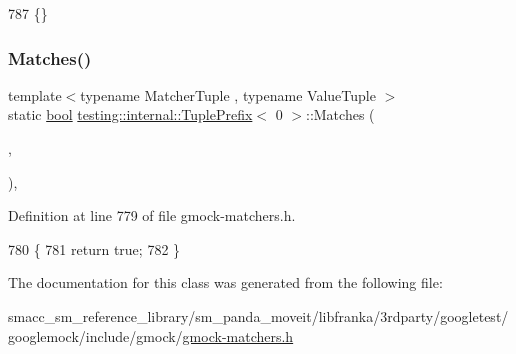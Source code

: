 \begin{DoxyCode}
787                                                     \{\}
\end{DoxyCode}
\mbox{\label{classtesting_1_1internal_1_1TuplePrefix_3_010_01_4_a8bb323da9f209f4fef5d81d7c0b628e9}} 
\subsubsection{\texorpdfstring{Matches()}{Matches()}}
{\footnotesize\ttfamily template$<$typename Matcher\+Tuple , typename Value\+Tuple $>$ \\
static \hyperlink{classbool}{bool} \hyperlink{classtesting_1_1internal_1_1TuplePrefix}{testing\+::internal\+::\+Tuple\+Prefix}$<$ 0 $>$\+::Matches (\begin{DoxyParamCaption}\item[{const \hyperlink{structtesting_1_1internal_1_1MatcherTuple}{Matcher\+Tuple} \&}]{,  }\item[{const Value\+Tuple \&}]{ }\end{DoxyParamCaption})\hspace{0.3cm}{\ttfamily [inline]}, {\ttfamily [static]}}



Definition at line 779 of file gmock-\/matchers.\+h.


\begin{DoxyCode}
780                                            \{
781     \textcolor{keywordflow}{return} \textcolor{keyword}{true};
782   \}
\end{DoxyCode}


The documentation for this class was generated from the following file\+:\begin{DoxyCompactItemize}
\item 
smacc\+\_\+sm\+\_\+reference\+\_\+library/sm\+\_\+panda\+\_\+moveit/libfranka/3rdparty/googletest/googlemock/include/gmock/\hyperlink{gmock-matchers_8h}{gmock-\/matchers.\+h}\end{DoxyCompactItemize}
